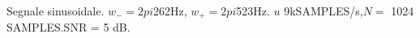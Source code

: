 Segnale sinusoidale. $w_{-}=2pi$262Hz, $w_{+}=2pi$523Hz. $
u$ 9kSAMPLES/s,$N=$ 1024 SAMPLES.SNR = 5 dB.